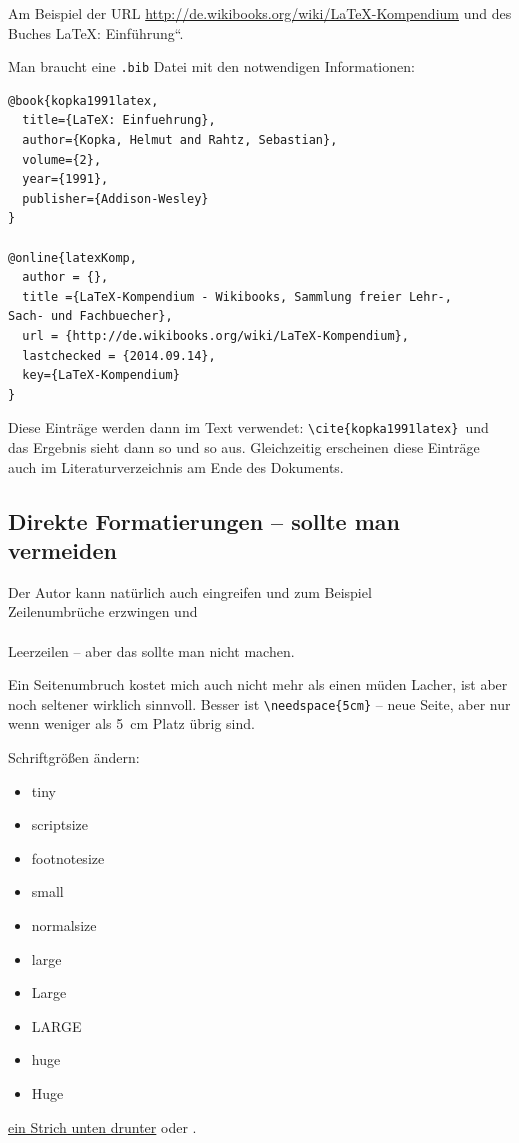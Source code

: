Am Beispiel der URL \url{http://de.wikibooks.org/wiki/LaTeX-Kompendium}
und des Buches \quotedblbase \LaTeX{}: Einführung``.

Man braucht eine \texttt{.bib} Datei mit den notwendigen Informationen:

\begin{lstlisting}[language={[LaTeX]TeX}]
@book{kopka1991latex,
  title={LaTeX: Einfuehrung},
  author={Kopka, Helmut and Rahtz, Sebastian},
  volume={2},
  year={1991},
  publisher={Addison-Wesley}
}

@online{latexKomp,
  author = {},
  title ={LaTeX-Kompendium - Wikibooks, Sammlung freier Lehr-,
Sach- und Fachbuecher},
  url = {http://de.wikibooks.org/wiki/LaTeX-Kompendium},
  lastchecked = {2014.09.14},
  key={LaTeX-Kompendium}
}
\end{lstlisting}


Diese Einträge werden dann im Text verwendet: \texttt{\textbackslash{}cite\{kopka1991latex\}
}und das Ergebnis sieht dann so \citep{kopka1991latex} und so \citep{latexKomp}
aus. Gleichzeitig erscheinen diese Einträge auch im Literaturverzeichnis
am Ende des Dokuments.


\subsection{Direkte Formatierungen -- sollte man vermeiden}

Der Autor kann natürlich auch eingreifen und zum Beispiel\\
Zeilenumbrüche erzwingen und \\
\\
Leerzeilen -- aber das sollte man nicht machen. \newpage{}

Ein Seitenumbruch kostet mich auch nicht mehr als einen müden Lacher,
ist aber noch seltener wirklich sinnvoll.
Besser ist \texttt{\textbackslash{}needspace\{5cm\}} -- neue Seite, aber nur wenn weniger als 5~cm Platz übrig sind.

Schriftgrößen ändern:
\begin{itemize}
\item {\tiny{}tiny}
\item {\scriptsize{}scriptsize}
\item {\footnotesize{}footnotesize}
\item {\small{}small}
\item normalsize
\item {\large{}large}
\item {\Large{}Large}
\item {\LARGE{}LARGE}
\item {\huge{}huge}
\item {\Huge{}Huge}
\end{itemize}

\uline{ein Strich unten drunter} oder .


